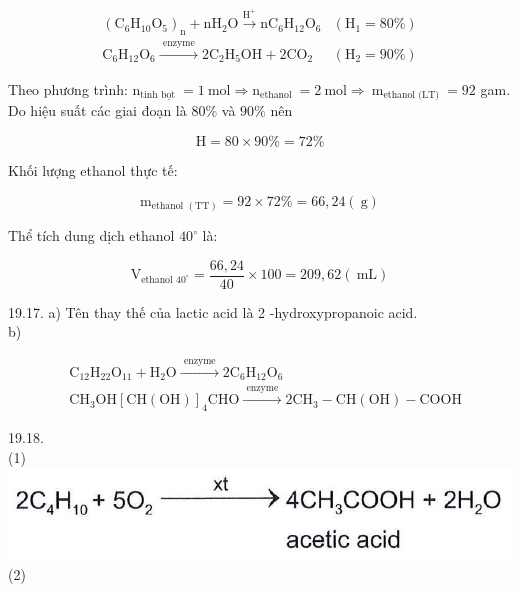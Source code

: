 \documentclass[10pt]{article}
\begin{document}
$$
\begin{array}{ll}
\left(\mathrm{C}_{6} \mathrm{H}_{10} \mathrm{O}_{5}\right)_{\mathrm{n}}+\mathrm{nH}_{2} \mathrm{O} \xrightarrow{\mathrm{H}^{+}} \mathrm{nC}_{6} \mathrm{H}_{12} \mathrm{O}_{6} & \left(\mathrm{H}_{1}=80 \%\right) \\
\mathrm{C}_{6} \mathrm{H}_{12} \mathrm{O}_{6} \xrightarrow{\text { enzyme }} 2 \mathrm{C}_{2} \mathrm{H}_{5} \mathrm{OH}+2 \mathrm{CO}_{2} & \left(\mathrm{H}_{2}=90 \%\right)
\end{array}
$$

Theo phương trình: $\mathrm{n}_{\text {tinh bọt }}=1 \mathrm{~mol} \Rightarrow \mathrm{n}_{\text {ethanol }}=2 \mathrm{~mol} \Rightarrow \mathrm{~m}_{\text {ethanol (LT) }}=92$ gam.\\
Do hiệu suất các giai đoạn là $80 \%$ và $90 \%$ nên

$$
\mathrm{H}=80 \times 90 \%=72 \%
$$

Khối lượng ethanol thực tế:

$$
\mathrm{m}_{\text {ethanol }(\mathrm{TT})}=92 \times 72 \%=66,24(\mathrm{~g})
$$

Thể tích dung dịch ethanol $40^{\circ}$ là:

$$
\mathrm{V}_{\text {ethanol } 40^{\circ}}=\frac{66,24}{40} \times 100=209,62(\mathrm{~mL})
$$

19.17. a) Tên thay thế của lactic acid là 2 -hydroxypropanoic acid.\\
b)

$$
\begin{aligned}
& \mathrm{C}_{12} \mathrm{H}_{22} \mathrm{O}_{11}+\mathrm{H}_{2} \mathrm{O} \xrightarrow{\text { enzyme }} 2 \mathrm{C}_{6} \mathrm{H}_{12} \mathrm{O}_{6} \\
& \mathrm{CH}_{3} \mathrm{OH}[\mathrm{CH}(\mathrm{OH})]_{4} \mathrm{CHO} \xrightarrow{\text { enzyme }} 2 \mathrm{CH}_{3}-\mathrm{CH}(\mathrm{OH})-\mathrm{COOH}
\end{aligned}
$$

19.18.\\
(1)\\
\includegraphics[max width=\textwidth, center]{2025_10_23_adad5b98d65ac6665838g-40}\\
(2)
\end{document}
